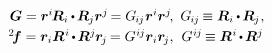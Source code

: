   

\nopagebreak\vspace{-0.1em}\begin{equation}\label{componentsofdeformationtensors}
\begin{array}{r@{\hspace{.5em}}c}
\bm{G} = \bm{r}^i \hspace{-0.25ex} \bm{R}_i \hspace{-0.1ex} \dotp \hspace{-0.15ex} \bm{R}_{\hspace{-0.1ex}j} \bm{r}^j \hspace{-0.25ex}
= G_{\hspace{-0.15ex}i\hspace{-0.1ex}j} \hspace{.1ex} \bm{r}^i \bm{r}^j
\hspace{-0.3ex} , &
G_{\hspace{-0.15ex}i\hspace{-0.1ex}j} \hspace{-0.2ex} \equiv
\bm{R}_i \hspace{-0.1ex} \dotp \hspace{-0.15ex} \bm{R}_{\hspace{-0.1ex}j}
\hspace{.1ex} ,
\\[.25em]
%
{^2\hspace{-0.4ex}\bm{f}} =  \bm{r}_i \bm{R}^{\hspace{.1ex}i} \hspace{-0.2ex} \dotp \hspace{-0.15ex} \bm{R}^j \hspace{-0.1ex} \bm{r}_{\hspace{-0.2ex}j} \hspace{-0.2ex}
= G^{\hspace{.1ex}i\hspace{-0.1ex}j} \bm{r}_i \bm{r}_{\hspace{-0.2ex}j} \hspace{-0.2ex}
\hspace{.2ex} , &
G^{\hspace{.1ex}i\hspace{-0.1ex}j} \hspace{-0.2ex} \equiv
\bm{R}^{\hspace{.1ex}i} \hspace{-0.2ex} \dotp \hspace{-0.15ex} \bm{R}^j

\end{array}
\end{equation}
